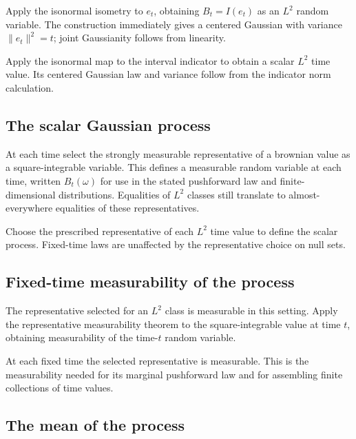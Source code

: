 \documentclass[11pt,a4paper]{report}
\begin{document}
Apply the isonormal isometry to \(e_t\), obtaining \(B_t=I(e_t)\) as an \(L^2\) random variable. The construction immediately gives a centered Gaussian with variance \(\|e_t\|^2=t\); joint Gaussianity follows from linearity.



Apply the isonormal map to the interval indicator to obtain a scalar \(L^2\) time value. Its centered Gaussian law and variance follow from the indicator norm calculation.

\subsection{\texorpdfstring{The scalar Gaussian process}{The scalar Gaussian process}}
\label{report-step-UnadjustedLangevin-CanonicalBrownian-lean-10}


At each time select the strongly measurable representative of a brownian value as a square-integrable variable. This defines a measurable random variable at each time, written \(B_t(\omega)\) for use in the stated pushforward law and finite-dimensional distributions. Equalities of \(L^2\) classes still translate to almost-everywhere equalities of these representatives.



Choose the prescribed representative of each \(L^2\) time value to define the scalar process. Fixed-time laws are unaffected by the representative choice on null sets.

\subsection{\texorpdfstring{Fixed-time measurability of the process}{Fixed-time measurability of the process}}
\label{report-step-UnadjustedLangevin-CanonicalBrownian-lean-11}


The representative selected for an \(L^2\) class is measurable in this setting. Apply the representative measurability theorem to the square-integrable value at time \(t\), obtaining measurability of the time-\(t\) random variable.



At each fixed time the selected representative is measurable. This is the measurability needed for its marginal pushforward law and for assembling finite collections of time values.

\subsection{\texorpdfstring{The mean of the process}{The mean of the process}}
\label{report-step-UnadjustedLangevin-CanonicalBrownian-lean-12}
\end{document}
